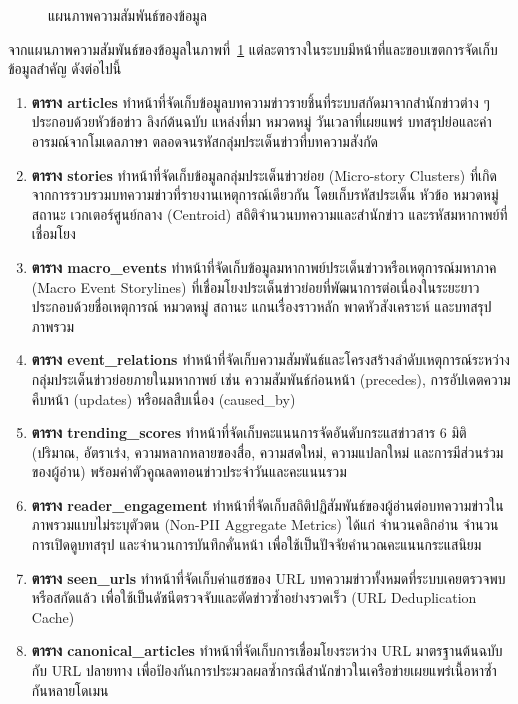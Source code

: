 \begin{figure}[H]
{%
}
\caption{แผนภาพความสัมพันธ์ของข้อมูล}
\label{fig_relational_schema}
\end{figure}

จากแผนภาพความสัมพันธ์ของข้อมูลในภาพที่~\ref{fig_relational_schema} แต่ละตารางในระบบมีหน้าที่และขอบเขตการจัดเก็บข้อมูลสำคัญ ดังต่อไปนี้
\begin{enumerate}
    \item \textbf{ตาราง articles} ทำหน้าที่จัดเก็บข้อมูลบทความข่าวรายชิ้นที่ระบบสกัดมาจากสำนักข่าวต่าง ๆ ประกอบด้วยหัวข้อข่าว ลิงก์ต้นฉบับ แหล่งที่มา หมวดหมู่ วันเวลาที่เผยแพร่ บทสรุปย่อและค่าอารมณ์จากโมเดลภาษา ตลอดจนรหัสกลุ่มประเด็นข่าวที่บทความสังกัด
    \item \textbf{ตาราง stories} ทำหน้าที่จัดเก็บข้อมูลกลุ่มประเด็นข่าวย่อย (Micro-story Clusters) ที่เกิดจากการรวบรวมบทความข่าวที่รายงานเหตุการณ์เดียวกัน โดยเก็บรหัสประเด็น หัวข้อ หมวดหมู่ สถานะ เวกเตอร์ศูนย์กลาง (Centroid) สถิติจำนวนบทความและสำนักข่าว และรหัสมหากาพย์ที่เชื่อมโยง
    \item \textbf{ตาราง macro\_events} ทำหน้าที่จัดเก็บข้อมูลมหากาพย์ประเด็นข่าวหรือเหตุการณ์มหาภาค (Macro Event Storylines) ที่เชื่อมโยงประเด็นข่าวย่อยที่พัฒนาการต่อเนื่องในระยะยาว ประกอบด้วยชื่อเหตุการณ์ หมวดหมู่ สถานะ แกนเรื่องราวหลัก พาดหัวสังเคราะห์ และบทสรุปภาพรวม
    \item \textbf{ตาราง event\_relations} ทำหน้าที่จัดเก็บความสัมพันธ์และโครงสร้างลำดับเหตุการณ์ระหว่างกลุ่มประเด็นข่าวย่อยภายในมหากาพย์ เช่น ความสัมพันธ์ก่อนหน้า (precedes), การอัปเดตความคืบหน้า (updates) หรือผลสืบเนื่อง (caused\_by)
    \item \textbf{ตาราง trending\_scores} ทำหน้าที่จัดเก็บคะแนนการจัดอันดับกระแสข่าวสาร 6 มิติ (ปริมาณ, อัตราเร่ง, ความหลากหลายของสื่อ, ความสดใหม่, ความแปลกใหม่ และการมีส่วนร่วมของผู้อ่าน) พร้อมค่าตัวคูณลดทอนข่าวประจำวันและคะแนนรวม
    \item \textbf{ตาราง reader\_engagement} ทำหน้าที่จัดเก็บสถิติปฏิสัมพันธ์ของผู้อ่านต่อบทความข่าวในภาพรวมแบบไม่ระบุตัวตน (Non-PII Aggregate Metrics) ได้แก่ จำนวนคลิกอ่าน จำนวนการเปิดดูบทสรุป และจำนวนการบันทึกคั่นหน้า เพื่อใช้เป็นปัจจัยคำนวณคะแนนกระแสนิยม
    \item \textbf{ตาราง seen\_urls} ทำหน้าที่จัดเก็บค่าแฮชของ URL บทความข่าวทั้งหมดที่ระบบเคยตรวจพบหรือสกัดแล้ว เพื่อใช้เป็นดัชนีตรวจจับและตัดข่าวซ้ำอย่างรวดเร็ว (URL Deduplication Cache)
    \item \textbf{ตาราง canonical\_articles} ทำหน้าที่จัดเก็บการเชื่อมโยงระหว่าง URL มาตรฐานต้นฉบับกับ URL ปลายทาง เพื่อป้องกันการประมวลผลซ้ำกรณีสำนักข่าวในเครือข่ายเผยแพร่เนื้อหาซ้ำกันหลายโดเมน
\end{enumerate}

